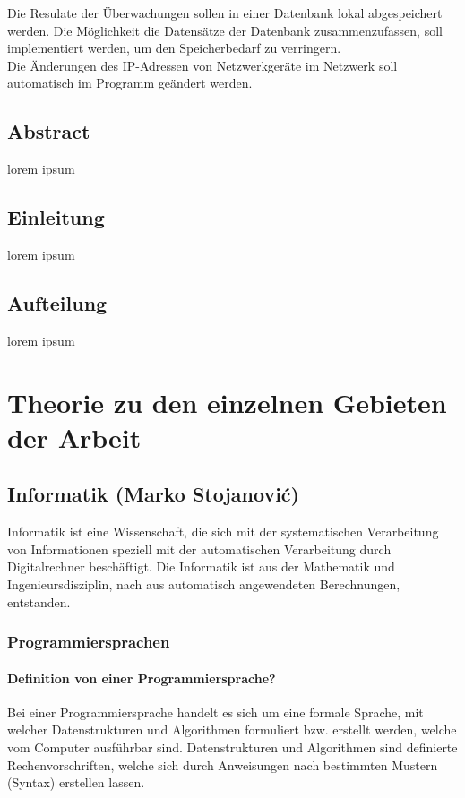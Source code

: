 \documentclass[12pt,a4paper]{report}
\begin{document}
\begin{onehalfspace}
Die Resulate der Überwachungen sollen in einer Datenbank lokal abgespeichert werden. Die Möglichkeit die Datensätze der Datenbank zusammenzufassen, soll implementiert werden, um den Speicherbedarf zu verringern.\\

Die Änderungen des IP-Adressen von Netzwerkgeräte im Netzwerk soll automatisch im Programm geändert werden.\\

\chapter{Abstract}
lorem ipsum
\chapter{Einleitung}
lorem ipsum
\chapter{Aufteilung}
lorem ipsum 

\part{Theorie zu den einzelnen Gebieten der Arbeit}
\chapter{Informatik (Marko Stojanovi\'{c})}
Informatik ist eine Wissenschaft, die sich mit der systematischen Verarbeitung von Informationen speziell mit der automatischen Verarbeitung durch Digitalrechner beschäftigt. Die Informatik ist aus der Mathematik und Ingenieursdisziplin, nach aus automatisch angewendeten Berechnungen, entstanden.

\section{Programmiersprachen}

\subsection{Definition von einer Programmiersprache?}
Bei einer Programmiersprache handelt es sich um eine formale Sprache, mit welcher Datenstrukturen und Algorithmen formuliert bzw. erstellt werden, welche vom Computer ausführbar sind. Datenstrukturen und Algorithmen sind definierte Rechenvorschriften, welche sich durch Anweisungen nach bestimmten Mustern (Syntax) erstellen lassen.\\


\end{onehalfspace}
\end{document}
